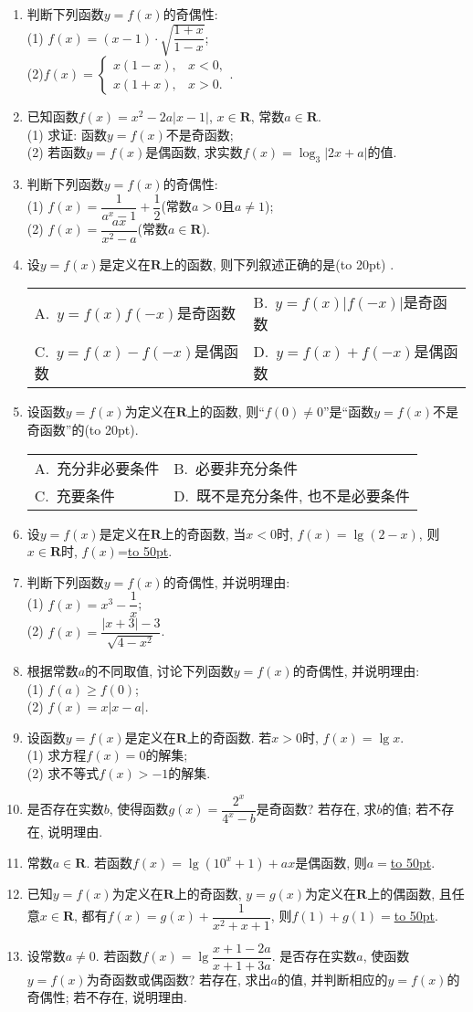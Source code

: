 \documentclass[10pt,a4paper]{article}
\newcommand{\blank}[1]{\underline{\hbox to #1pt{}}}
\newcommand{\bracket}[1]{(\hbox to #1pt{})}
\newcommand{\twoch}[4]{\par\begin{tabular}{p{.46\textwidth}p{.46\textwidth}}
A.~#1& B.~#2\\
C.~#3& D.~#4
\end{tabular}}
\begin{document}
\begin{enumerate}[1.]
\item 判断下列函数$y=f(x)$的奇偶性:\\
(1) $f(x)=(x-1)\cdot \sqrt{\dfrac{1+x}{1-x}}$;\\
(2)$f(x)=\begin{cases} x(1-x), & x<0, \\ x(1+x),& x>0. \end{cases}$.
\item 已知函数$f(x)=x^2-2a|x-1|$, $x\in \mathbf{R}$, 常数$a\in \mathbf{R}$.\\
(1) 求证: 函数$y=f(x)$不是奇函数;\\
(2) 若函数$y=f(x)$是偶函数, 求实数$f(x)=\log_3| 2x+a |$的值.
\item 判断下列函数$y=f(x)$的奇偶性:\\
(1) $f(x)=\dfrac 1{a^x-1}+\dfrac 12$(常数$a>0$且$a\ne 1$);\\
(2) $f(x)=\dfrac{ax}{x^2-a}$(常数$a\in \mathbf{R}$).
\item 设$y=f(x)$是定义在$\mathbf{R}$上的函数, 则下列叙述正确的是\bracket{20} .
\twoch{$y=f(x)f(-x)$是奇函数}{$y=f(x)|f(-x)|$是奇函数}{$y=f(x)-f(-x)$是偶函数	}{$y=f(x)+f(-x)$是偶函数}
\item 设函数$y=f(x)$为定义在$\mathbf{R}$上的函数, 则``$f(0)\ne 0$''是``函数$y=f(x)$不是奇函数''的\bracket{20}.
\twoch{充分非必要条件}{必要非充分条件}{充要条件}{既不是充分条件, 也不是必要条件}
\item 设$y=f(x)$是定义在$\mathbf{R}$上的奇函数, 当$x<0$时, $f(x)=\lg(2-x)$, 则$x\in \mathbf{R}$时, $f(x)$=\blank{50}.
\item 判断下列函数$y=f(x)$的奇偶性, 并说明理由:\\
(1) $f(x)=x^3-\dfrac 1x$;\\
(2) $f(x)=\dfrac{|x+3|-3}{\sqrt{4-x^2}}$.
\item 根据常数$a$的不同取值, 讨论下列函数$y=f(x)$的奇偶性, 并说明理由:\\
(1) $f(a)\ge f(0)$;\\
(2) $f(x)=x|x-a|$.
\item 设函数$y=f(x)$是定义在$\mathbf{R}$上的奇函数. 若$x>0$时, $f(x)=\lg x$.\\
(1) 求方程$f(x)=0$的解集;\\
(2) 求不等式$f(x)>-1$的解集.
\item 是否存在实数$b$, 使得函数$g(x)=\dfrac{2^x}{{4^x}-b}$是奇函数? 若存在, 求$b$的值; 若不存在, 说明理由.
\item 常数$a\in \mathbf{R}$. 若函数$f(x)=\lg(10^x+1)+ax$是偶函数, 则$a=$\blank{50}.
\item 已知$y=f(x)$为定义在$\mathbf{R}$上的奇函数, $y=g(x)$为定义在$\mathbf{R}$上的偶函数, 且任意$x\in \mathbf{R}$, 都有$f(x)=g(x)+\dfrac{1}{x^2+x+1}$, 则$f(1)+g(1)=$\blank{50}.
\item 设常数$a\ne 0$. 若函数$f(x)=\lg \dfrac{x+1-2a}{x+1+3a}$. 是否存在实数$a$, 使函数$y=f(x)$为奇函数或偶函数? 若存在, 求出$a$的值, 并判断相应的$y=f(x)$的奇偶性; 若不存在, 说明理由.


\end{enumerate}
\end{document}
